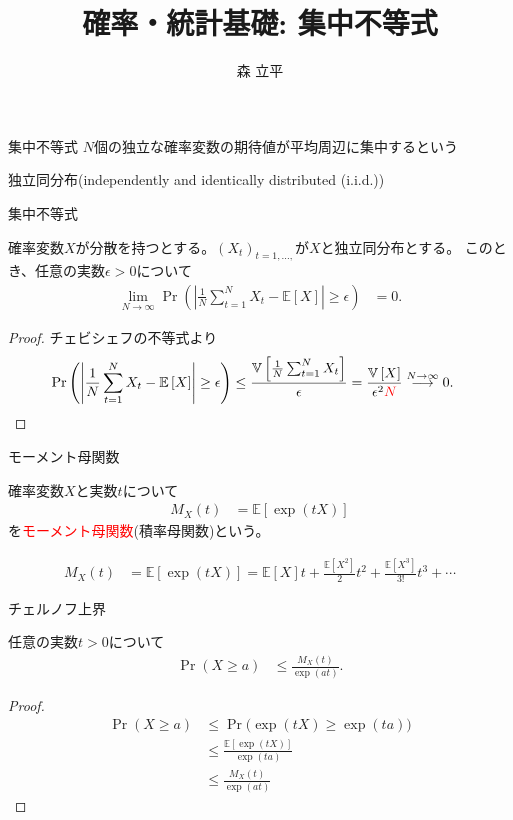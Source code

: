 \documentclass[lualatex,handout]{beamer}
\title{確率・統計基礎: 集中不等式}
\author{森 立平}
\date{}
\newcommand{\emm}[1]{\textcolor{red}{#1}}
\newcommand{\expt}[1]{\mathbb{E}\left[#1\right]}
\newcommand{\var}[1]{\mathbb{V}\left[#1\right]}
\theoremstyle{definition}
\begin{document}
\begin{frame}[plain]
\maketitle
\end{frame}

\begin{frame}{集中不等式}
$N$個の独立な確率変数の期待値が平均周辺に集中するという

独立同分布(independently and identically distributed (i.i.d.))
\end{frame}


\begin{frame}{集中不等式}
\begin{theorem}[大数の弱法則]
確率変数$X$が分散を持つとする。$(X_t)_{t=1,\dotsc,}$が$X$と独立同分布とする。
このとき、任意の実数$\epsilon>0$について
\begin{align*}
\lim_{N\to\infty}\Pr\left(\left|\frac1N\sum_{t=1}^N X_t-\expt{X}\right|\ge \epsilon\right) &=0.
\end{align*}
\end{theorem}
\begin{proof}
チェビシェフの不等式より
\begin{align*}
\Pr\left(\left|\frac1N\sum_{t=1}^N X_t-\expt{X}\right|\ge \epsilon\right) &\le
\frac{\var{\frac1N\sum_{t=1}^NX_t}}{\epsilon} = \frac{\var{X}}{\epsilon^2\emm{N}}\stackrel{N\to\infty}{\longrightarrow} 0.
\end{align*}
\end{proof}
\end{frame}

\begin{frame}{モーメント母関数}
\begin{definition}
確率変数$X$と実数$t$について
\begin{align*}
M_X(t) &= \expt{\exp(tX)}
\end{align*}
を\emm{モーメント母関数}(積率母関数)という。
\end{definition}
\begin{align*}
M_X(t) &= \expt{\exp(tX)} = \expt{X} t + \frac{\expt{X^2}}2 t^2 + \frac{\expt{X^3}}{3!} t^3 + \dotsb
\end{align*}
\begin{example}
\end{example}
\end{frame}

\begin{frame}{チェルノフ上界}
\begin{theorem}
任意の実数$t>0$について
\begin{align*}
\Pr(X\ge a)&\le\frac{M_X(t)}{\exp(at)}.
\end{align*}
\end{theorem}
\begin{proof}
\begin{align*}
\Pr(X\ge a)&\le\Pr\bigl(\exp(tX)\ge\exp(ta)\bigr)\\
&\le\frac{\expt{\exp(tX)}}{\exp(ta)}\\
&\le\frac{M_X(t)}{\exp(at)}
\end{align*}
\end{proof}
\end{frame}
\end{document}
